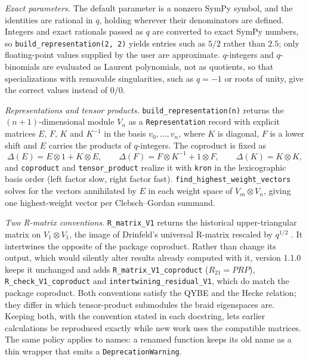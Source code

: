 \documentclass[11pt,a4paper]{article}
\newcommand{\code}[1]{\texttt{#1}}
\begin{document}
\emph{Exact parameters.} The default parameter is a nonzero SymPy symbol, and the identities are rational in $q$, holding wherever their denominators are defined. Integers and exact rationals passed as $q$ are converted to exact SymPy numbers, so \code{build\_representation(2, 2)} yields entries such as $5/2$ rather than $2.5$; only floating-point values supplied by the user are approximate. $q$-integers and $q$-binomials are evaluated as Laurent polynomials, not as quotients, so that specializations with removable singularities, such as $q=-1$ or roots of unity, give the correct values instead of $0/0$.

\emph{Representations and tensor products.} \code{build\_representation(n)} returns the $(n+1)$-dimensional module $V_n$ as a \code{Representation} record with explicit matrices $E$, $F$, $K$ and $K^{-1}$ in the basis $v_0,\dots,v_n$, where $K$ is diagonal, $F$ is a lower shift and $E$ carries the products of $q$-integers. The coproduct is fixed as
\[
\Delta(E)=E\otimes 1+K\otimes E,\qquad \Delta(F)=F\otimes K^{-1}+1\otimes F,\qquad \Delta(K)=K\otimes K,
\]
and \code{coproduct} and \code{tensor\_product} realize it with \code{kron} in the lexicographic basis order (left factor slow, right factor fast). \code{find\_highest\_weight\_vectors} solves for the vectors annihilated by $E$ in each weight space of $V_m\otimes V_n$, giving one highest-weight vector per Clebsch--Gordan summand.

\emph{Two R-matrix conventions.} \code{R\_matrix\_V1} returns the historical upper-triangular matrix on $V_1\otimes V_1$, the image of Drinfeld's universal R-matrix rescaled by $q^{1/2}$ \cite{drinfeld1987}. It intertwines the opposite of the package coproduct. Rather than change its output, which would silently alter results already computed with it, version 1.1.0 keeps it unchanged and adds \code{R\_matrix\_V1\_coproduct} ($R_{21}=PRP$), \code{R\_check\_V1\_coproduct} and \code{intertwining\_residual\_V1}, which do match the package coproduct. Both conventions satisfy the QYBE and the Hecke relation; they differ in which tensor-product submodules the braid eigenspaces are. Keeping both, with the convention stated in each docstring, lets earlier calculations be reproduced exactly while new work uses the compatible matrices. The same policy applies to names: a renamed function keeps its old name as a thin wrapper that emits a \code{DeprecationWarning}.
\end{document}
